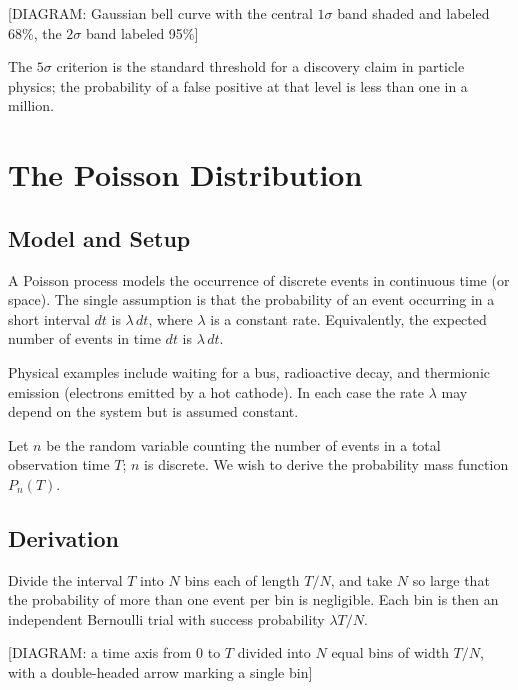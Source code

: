 \begin{center}[DIAGRAM: Gaussian bell curve with the central $1\sigma$ band shaded and labeled 68\%, the $2\sigma$ band labeled 95\%]\end{center}

The $5\sigma$ criterion is the standard threshold for a discovery claim in particle physics; the probability of a false positive at that level is less than one in a million.

\section{The Poisson Distribution}

\subsection{Model and Setup}

\begin{definition}
A Poisson process models the occurrence of discrete events in continuous time (or space). The single assumption is that the probability of an event occurring in a short interval $dt$ is $\lambda\,dt$, where $\lambda$ is a constant rate. Equivalently, the expected number of events in time $dt$ is $\lambda\,dt$.
\end{definition}

Physical examples include waiting for a bus, radioactive decay, and thermionic emission (electrons emitted by a hot cathode). In each case the rate $\lambda$ may depend on the system but is assumed constant.

Let $n$ be the random variable counting the number of events in a total observation time $T$; $n$ is discrete. We wish to derive the probability mass function $P_n(T)$.

\subsection{Derivation}

Divide the interval $T$ into $N$ bins each of length $T/N$, and take $N$ so large that the probability of more than one event per bin is negligible. Each bin is then an independent Bernoulli trial with success probability $\lambda T/N$.

\begin{center}[DIAGRAM: a time axis from $0$ to $T$ divided into $N$ equal bins of width $T/N$, with a double-headed arrow marking a single bin]\end{center}

